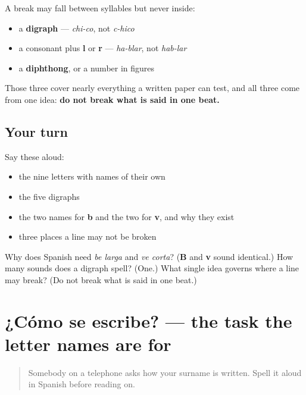 \begin{grammarlens}[title={Grammar Lens: the three things that stop a line break}]
A break may fall between syllables but never inside:

\begin{itemize}
\raggedright
  \item a \textbf{digraph} — \emph{chi-co}, not \emph{c-hico}
  \item a consonant plus \textbf{l} or \textbf{r} — \emph{ha-blar}, not \emph{hab-lar}
  \item a \textbf{diphthong}, or a number in figures
\end{itemize}

Those three cover nearly everything a written paper can test, and all three come from one idea: \textbf{do not break what is said in one beat.}
\end{grammarlens}

\subsection*{Your turn}
Say these aloud:

\begin{itemize}
\raggedright
  \item the nine letters with names of their own
  \item the five digraphs
  \item the two names for \textbf{b} and the two for \textbf{v}, and why they exist
  \item three places a line may not be broken
\end{itemize}

\begin{tcolorbox}[breakable,colback=teal!4,colframe=teal!35!black,title={Before you move on}]
Why does Spanish need \emph{be larga} and \emph{ve corta}? (\textbf{B} and \textbf{v} sound identical.) How many sounds does a digraph spell? (One.) What single idea governs where a line may break? (Do not break what is said in one beat.)
\end{tcolorbox}
\section[¿Cómo se escribe?]{¿Cómo se escribe? — the task the letter names are for}

\label{lesson:ES-C425-sintesis-deletreo}



\begin{quote}
Somebody on a telephone asks how your surname is written. Spell it aloud in Spanish before reading on.
\end{quote}

